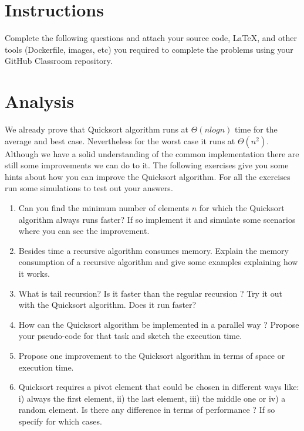 \documentclass[a4 paper,12pt]{article}
\begin{document}

\section{Instructions}

Complete the following questions and attach your source code, LaTeX, and other tools (Dockerfile, images, etc)  you required to complete the problems using your GitHub Classroom repository.

\section{Analysis}

We already prove that Quicksort algorithm runs at $\Theta(nlogn)$ time for the average and best case. Nevertheless for the worst case it runs at $\Theta(n^{2})$. Although we have a solid understanding of the common implementation there are still some improvements we can do to it. The following exercises give you some hints about how you can improve the Quicksort algorithm. For all the exercises run some simulations to test out your answers.

\begin{enumerate}
\setlength\itemsep{1.2em}
    \item Can you find the minimum number of elements $n$ for which the Quicksort algorithm always runs faster? If so implement it and simulate some scenarios where you can see the improvement. 
    
    \item Besides time a recursive algorithm consumes memory. Explain the memory consumption of a recursive algorithm and give some examples explaining how it works.
    
    \item What is tail recursion? Is it faster than the regular recursion ? Try it out with the Quicksort algorithm. Does it run faster?
    
    \item How can the Quicksort algorithm be implemented in a parallel way ? Propose your pseudo-code for that task and sketch the execution time.
    
    \item Propose one improvement to the Quicksort algorithm in terms of space or execution time.
    
    \item Quicksort requires a pivot element that could be chosen in different ways like: i) always the first element, ii) the last element, iii) the middle one or iv) a random element. Is there any difference in terms of performance ? If so specify for which cases.
    
\end{enumerate}
\end{document}
